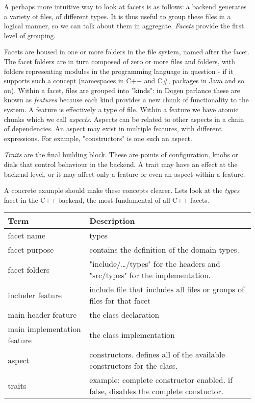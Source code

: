 \documentclass[11pt]{article}
\begin{document}
\begin{enumerate}
\begin{enumerate}
A perhaps more intuitive way to look at facets is as follows: a
backend generates a variety of files, of different types. It is thus
useful to group these files in a logical manner, so we can talk about
them in aggregate. \emph{Facets} provide the first level of grouping.

Facets are housed in one or more folders in the file system, named
after the facet. The facet folders are in turn composed of zero or
more files and folders, with folders representing modules in the
programming language in question - if it supports such a concept
(namespaces in C++ and C\#, packages in Java and so on). Within a
facet, files are grouped into "kinds": in Dogen parlance these are
known as \emph{features} because each kind provides a new chunk of
functionality to the system. A feature is effectively a type of
file. Within a feature we have atomic chunks which we call
\emph{aspects}. Aspects can be related to other aspects in a chain of
dependencies. An aspect may exist in multiple features, with different
expressions. For example, "constructors" is one such an aspect.

\emph{Traits} are the final building block. These are points of
configuration, knobs or dials that control behaviour in the backend. A
trait may have an effect at the backend level, or it may affect only a
feature or even an aspect within a feature.

A concrete example should make these concepts clearer. Lets look at
the \emph{types} facet in the C++ backend, the most fundamental of all C++
facets.

\begin{center}
\begin{tabular}{ll}
Term & Description\\
\hline
facet name & types\\
facet purpose & contains the definition of the domain types.\\
facet folders & "include/\ldots{}/types" for the headers and "src/types" for the implementation.\\
includer feature & include file that includes all files or groups of files for that facet\\
main header feature & the class declaration\\
main implementation feature & the class implementation\\
aspect & constructors. defines all of the available constructors for the class.\\
traits & example: complete constructor enabled. if false, disables the complete constuctor.\\
\end{tabular}
\end{center}


\end{enumerate}
\end{enumerate}
\end{document}
